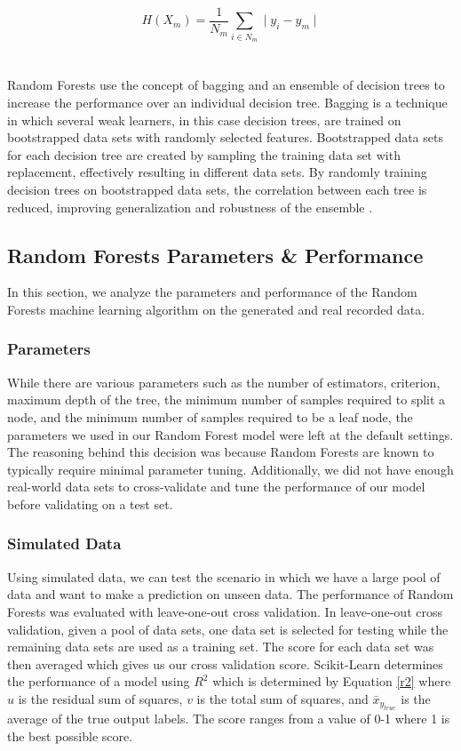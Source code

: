 \begin{equation}
\label{MAE}
    H(X_{m}) = \frac{1}{N_{m}}\sum_{i \in N_{m}}\mid y_{i} - y_{m}\mid
\end{equation}\\\\
Random Forests use the concept of bagging and an ensemble of decision trees to increase the performance over an individual decision tree. Bagging is a technique in which several weak learners, in this case decision trees, are trained on bootstrapped data sets with randomly selected features. Bootstrapped data sets for each decision tree are created by sampling the training data set with replacement, effectively resulting in different data sets. By randomly training decision trees on bootstrapped data sets, the correlation between each tree is reduced, improving generalization and robustness of the ensemble \cite{RF}.
\subsection{Random Forests Parameters \& Performance}
In this section, we analyze the parameters and performance of the Random Forests machine learning algorithm on the generated and real recorded data. 

\subsubsection{Parameters}
While there are various parameters such as the number of estimators, criterion, maximum depth of the tree, the minimum number of samples required to split a node, and the minimum number of samples required to be a leaf node, the parameters we used in our Random Forest model were left at the default settings. The reasoning behind this decision was because Random Forests are known to typically require minimal parameter tuning. Additionally, we did not have enough real-world data sets to cross-validate and tune the performance of our model before validating on a test set.

\subsubsection{Simulated Data}
Using simulated data, we can test the scenario in which we have a large pool of data and want to make a prediction on unseen data. The performance of Random Forests was evaluated with leave-one-out cross validation. In leave-one-out cross validation, given a pool of data sets, one data set is selected for testing while the remaining data sets are used as a training set. The score for each data set was then averaged which gives us our cross validation score. Scikit-Learn determines the performance of a model using $R^2$ which is determined by Equation \ref{r2} where $u$ is the residual sum of squares, $v$ is the total sum of squares, and $\bar{x}_{y_{true}}$ is the average of the true output labels. The score ranges from a value of 0-1 where 1 is the best possible score.

